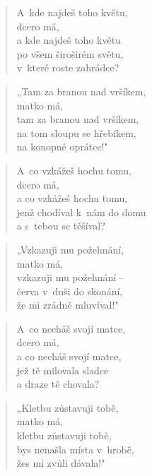 \begin{verse}
A~kde najdeš toho květu, \\
dcero má, \\
a kde najdeš toho květu \\
po všem široširém světu, \\
v~které roste zahrádce?
\end{verse}

\begin{verse}
„Tam za branou nad vršíkem, \\
matko má, \\
tam za branou nad vršíkem, \\
na tom sloupu se hřebíkem, \\
na konopné oprátce!"
\end{verse}

\begin{verse}
A~co vzkážeš hochu tomu, \\
dcero má, \\
a co vzkážeš hochu tomu, \\
jenž chodíval k~nám do domu \\
a s~tebou se těšíval?
\end{verse}

\begin{verse}
„Vzkazuji mu požehnání, \\
matko má, \\
vzkazuji mu požehnání -- \\
červa v~duši do skonání, \\
že mi zrádně mluvíval!"
\end{verse}

\begin{verse}
A~co necháš svojí matce, \\
dcero má, \\
a co necháš svojí matce, \\
jež tě milovala sladce \\
a draze tě chovala?
\end{verse}

\begin{verse}
„Kletbu zůstavuji tobě, \\
matko má, \\
kletbu zůstavuji tobě, \\
bys nenašla místa v~hrobě, \\
žes mi zvůli dávala!"
\end{verse}